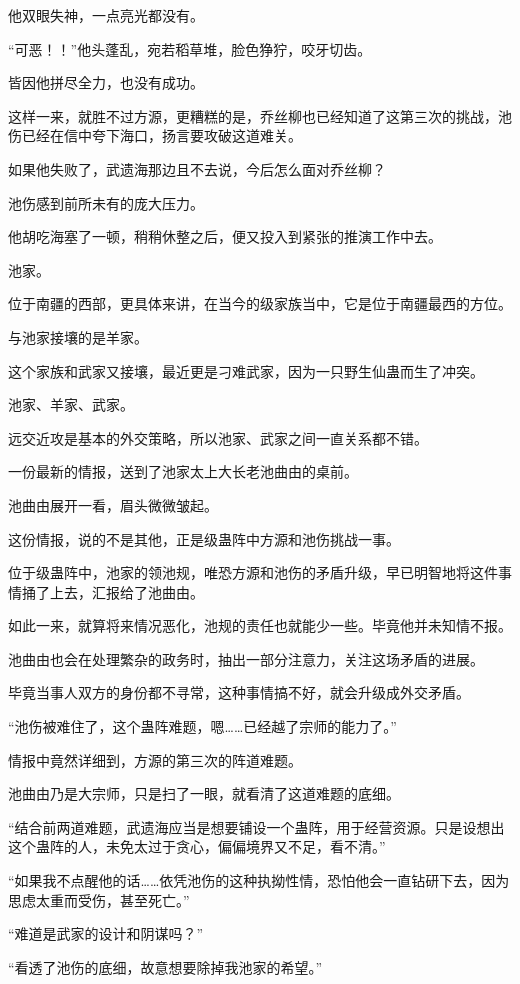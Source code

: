 \begin{this_body}
他双眼失神，一点亮光都没有。

“可恶！！”他头蓬乱，宛若稻草堆，脸色狰狞，咬牙切齿。

皆因他拼尽全力，也没有成功。

这样一来，就胜不过方源，更糟糕的是，乔丝柳也已经知道了这第三次的挑战，池伤已经在信中夸下海口，扬言要攻破这道难关。

如果他失败了，武遗海那边且不去说，今后怎么面对乔丝柳？

池伤感到前所未有的庞大压力。

他胡吃海塞了一顿，稍稍休整之后，便又投入到紧张的推演工作中去。

池家。

位于南疆的西部，更具体来讲，在当今的级家族当中，它是位于南疆最西的方位。

与池家接壤的是羊家。

这个家族和武家又接壤，最近更是刁难武家，因为一只野生仙蛊而生了冲突。

池家、羊家、武家。

远交近攻是基本的外交策略，所以池家、武家之间一直关系都不错。

一份最新的情报，送到了池家太上大长老池曲由的桌前。

池曲由展开一看，眉头微微皱起。

这份情报，说的不是其他，正是级蛊阵中方源和池伤挑战一事。

位于级蛊阵中，池家的领池规，唯恐方源和池伤的矛盾升级，早已明智地将这件事情捅了上去，汇报给了池曲由。

如此一来，就算将来情况恶化，池规的责任也就能少一些。毕竟他并未知情不报。

池曲由也会在处理繁杂的政务时，抽出一部分注意力，关注这场矛盾的进展。

毕竟当事人双方的身份都不寻常，这种事情搞不好，就会升级成外交矛盾。

“池伤被难住了，这个蛊阵难题，嗯……已经越了宗师的能力了。”

情报中竟然详细到，方源的第三次的阵道难题。

池曲由乃是大宗师，只是扫了一眼，就看清了这道难题的底细。

“结合前两道难题，武遗海应当是想要铺设一个蛊阵，用于经营资源。只是设想出这个蛊阵的人，未免太过于贪心，偏偏境界又不足，看不清。”

“如果我不点醒他的话……依凭池伤的这种执拗性情，恐怕他会一直钻研下去，因为思虑太重而受伤，甚至死亡。”

“难道是武家的设计和阴谋吗？”

“看透了池伤的底细，故意想要除掉我池家的希望。”


\end{this_body}
